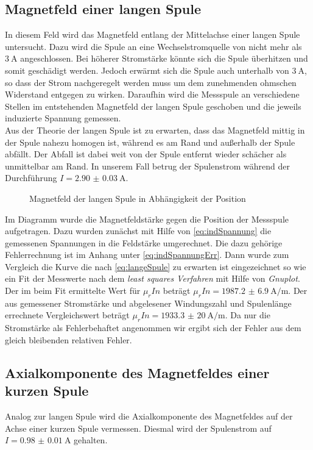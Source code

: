 \subsection{Magnetfeld einer langen Spule}
In diesem Feld wird das Magnetfeld entlang der Mittelachse einer langen Spule untersucht. Dazu wird die Spule an eine Wechselstromquelle von nicht mehr als $ \SI{3}{\ampere} $ angeschlossen. Bei höherer Stromstärke könnte sich die Spule überhitzen und somit geschädigt werden. Jedoch erwärmt sich die Spule auch unterhalb von $ \SI{3}{\ampere} $, so dass der Strom nachgeregelt werden muss um dem zunehmenden ohmschen Widerstand entgegen zu wirken. Daraufhin wird die Messspule an verschiedene Stellen im entstehenden Magnetfeld der langen Spule geschoben und die jeweils induzierte Spannung gemessen. \\
Aus der Theorie der langen Spule ist zu erwarten, dass das Magnetfeld mittig in der Spule nahezu homogen ist, während es am Rand und außerhalb der Spule abfällt. Der Abfall ist dabei weit von der Spule entfernt wieder schächer als unmittelbar am Rand.
In unserem Fall betrug der Spulenstrom während der Durchführung $ I = \SI{2.90(3)}{\ampere} $. 

\begin{figure}[H]
  \centering

\caption{Magnetfeld der langen Spule in Abhängigkeit der Position}
\end{figure}

Im Diagramm wurde die Magnetfeldstärke gegen die Position der Messspule aufgetragen. Dazu wurden zunächst mit Hilfe von \eqref{eq:indSpannung} die gemessenen Spannungen in die Feldstärke umgerechnet. Die dazu gehörige Fehlerrechnung ist im Anhang unter \eqref{eq:indSpannungErr}. Dann wurde zum Vergleich die Kurve die nach \eqref{eq:langeSpule} zu erwarten ist eingezeichnet so wie ein Fit der Messwerte nach dem \textit{least squares Verfahren} mit Hilfe von \textit{Gnuplot}. Der im beim Fit ermittelte Wert für $ \mu_r I n $ beträgt $ \mu_r I n = \SI{1987.2(69)}{\ampere\per\meter} $. Der aus gemessener Stromstärke und abgelesener Windungszahl und Spulenlänge errechnete Vergleichswert beträgt $ \mu_r I n = \SI{1933.3(200)}{\ampere\per\meter} $. Da nur die Stromstärke als Fehlerbehaftet angenommen wir ergibt sich der Fehler aus dem gleich bleibenden relativen Fehler.


\subsection{Axialkomponente des Magnetfeldes einer kurzen Spule}
Analog zur langen Spule wird die Axialkomponente des Magnetfeldes auf der Achse einer kurzen Spule vermessen. Diesmal wird der Spulenstrom auf $I=\SI{0.98(1)}{\ampere}$ gehalten.

